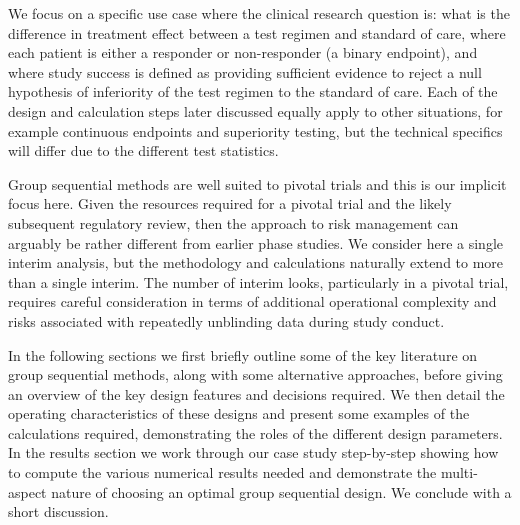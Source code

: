 \documentclass{article}
\begin{document}
We focus on a specific use case where the clinical research question is: what is the difference in treatment effect between a test regimen and standard of care, where each patient is either a responder or non-responder (a binary endpoint), and where study success is defined as providing sufficient evidence to reject a null hypothesis of inferiority of the test regimen to the standard of care. Each of the design and calculation steps later discussed equally apply to other situations, for example continuous endpoints and superiority testing, but the technical specifics will differ due to the different test statistics.  

Group sequential methods are well suited to pivotal trials and this is our implicit focus here. Given the resources required for a pivotal trial and the likely subsequent regulatory review, then the approach to risk management can arguably be rather different from earlier phase studies. We consider here a single interim analysis, but the methodology and calculations naturally extend to more than a single interim. The number of interim looks, particularly in a pivotal trial, requires careful consideration in terms of additional operational complexity and risks associated with repeatedly unblinding data during study conduct. 
 
In the following sections we first briefly outline some of the key literature on group sequential methods, along with some alternative approaches, before giving an overview of the key design features and decisions required. We then detail the operating characteristics of these designs and present some examples of the calculations required, demonstrating the roles of the different design parameters. In the results section we work through our case study step-by-step showing how to compute the various numerical results needed and demonstrate the multi-aspect nature of choosing an optimal group sequential design. We conclude with a short discussion. 
\end{document}
